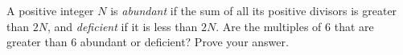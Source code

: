 A positive integer $N$ is \emph{abundant} if the sum of all its positive divisors is greater than $2N$, and \emph{deficient} if it is less than $2N$. Are the multiples of $6$ that are greater than $6$ abundant or deficient? Prove your answer.
